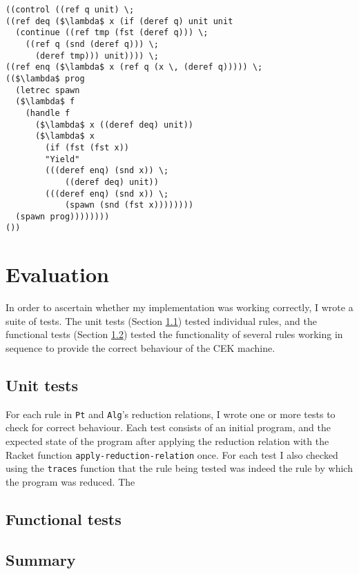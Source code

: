 \documentclass[12pt,a4paper,twoside,openright]{report}
\begin{document}
\begin{minipage}{\linewidth} \begin{lstlisting}[caption=Scheduler 1 in \texttt{Alg},label={lst:sched1}]
((control ((ref q unit) \;
((ref deq ($\lambda$ x (if (deref q) unit unit
  (continue ((ref tmp (fst (deref q))) \;
    ((ref q (snd (deref q))) \;
      (deref tmp))) unit)))) \;
((ref enq ($\lambda$ x (ref q (x \, (deref q))))) \;
(($\lambda$ prog
  (letrec spawn 
  ($\lambda$ f 
    (handle f 
      ($\lambda$ x ((deref deq) unit)) 
      ($\lambda$ x 
        (if (fst (fst x)) 
        "Yield" 
        (((deref enq) (snd x)) \;
            ((deref deq) unit)) 
        (((deref enq) (snd x)) \;
            (spawn (snd (fst x))))))))
  (spawn prog))))))))
())
\end{lstlisting} \end{minipage}

\chapter{Evaluation}

In order to ascertain whether my implementation was working correctly, I wrote a suite of tests. The unit tests (Section \ref{testunit}) tested individual rules, and the functional tests (Section \ref{testfun}) tested the functionality of several rules working in sequence to provide the correct behaviour of the CEK machine.

\section{Unit tests}\label{testunit}

For each rule in \texttt{Pt} and \texttt{Alg}'s reduction relations, I wrote one or more tests to check for correct behaviour. Each test consists of an initial program, and the expected state of the program after applying the reduction relation with the Racket function \texttt{apply-reduction-relation} once. For each test I also checked using the \texttt{traces} function that the rule being tested was indeed the rule by which the program was reduced. The 

\section{Functional tests}\label{testfun}

\section{Summary}
\end{document}
